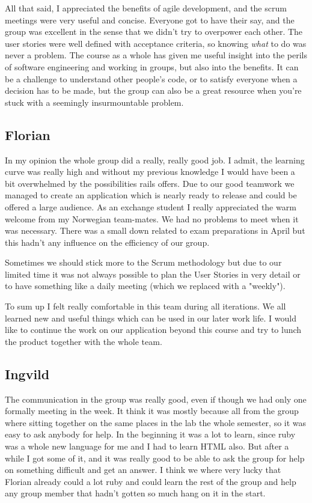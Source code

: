 \documentclass[a4paper]{article}
\begin{document}
\noindent
All that said, I appreciated the benefits of agile development, and the scrum meetings were very useful and concise. Everyone got to have their say, and the group was excellent in the sense that we didn't try to overpower each other. The user stories were well defined with acceptance criteria, so knowing \textit{what} to do was never a problem. The course as a whole has given me useful insight into the perils of software engineering and working in groups, but also into the benefits. It can be a challenge to understand other people's code, or to satisfy everyone when a decision has to be made, but the group can also be a great resource when you're stuck with a seemingly insurmountable problem.

\subsection{Florian}
In my opinion the whole group did a really, really good job. I admit, the learning curve was really high and without my previous knowledge I would have been a bit overwhelmed by the possibilities rails offers. Due to our good teamwork we managed to create an application which is nearly ready to release and could be offered a large audience. As an exchange student I really appreciated the warm welcome from my Norwegian team-mates. We had no problems to meet when it was necessary. There was a small down related to exam preparations in April but this hadn't any influence on the efficiency of our group.

\noindent
Sometimes we should stick more to the Scrum methodology but due to our limited time it was not always possible to plan the User Stories in very detail or to have something like a daily meeting (which we replaced with a "weekly").

\noindent
To sum up I felt really comfortable in this team during all iterations. We all learned new and useful things which can be used in our later work life. I would like to continue the work on our application beyond this course and try to lunch the product together with the whole team.

\subsection{Ingvild}
The communication in the group was really good, even if though we had only one formally meeting in the week. It think it was mostly because all from the group where sitting together on the same places in the lab the whole semester, so it was easy to ask anybody for help. In the beginning it was a lot to learn, since ruby was a whole new language for me and I had to learn HTML also. But after a while I got some of it, and it was really good to be able to ask the group for help on something difficult and get an answer. I think we where very lucky that Florian already could a lot ruby and could learn the rest of the group and help any group member that hadn't gotten so much hang on it in the start.\\
\end{document}
